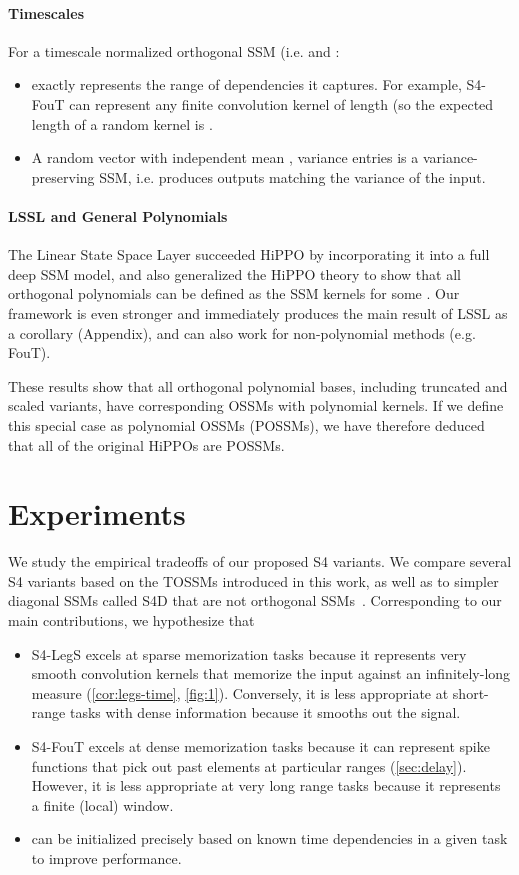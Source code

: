 \documentclass{article}
\begin{document}
\paragraph{Timescales}
For a timescale normalized orthogonal SSM (i.e.  and :
\begin{itemize}\item  exactly represents the range of dependencies it captures.
    For example, S4-FouT can represent any finite convolution kernel of length  (so the expected length of a random kernel is .
  \item A random vector  with independent mean , variance  entries is a variance-preserving SSM, i.e. produces outputs matching the variance of the input.
\end{itemize}

\paragraph{LSSL and General Polynomials}

The Linear State Space Layer \citep{gu2021lssl} succeeded HiPPO by incorporating it into a full deep SSM model, and also generalized the HiPPO theory to show that all orthogonal polynomials can be defined as the SSM kernels for some .
Our framework is even stronger and immediately produces the main result of LSSL as a corollary (Appendix), and can also work for non-polynomial methods (e.g. FouT).


These results show that all orthogonal polynomial bases, including truncated and scaled variants, have corresponding OSSMs with polynomial kernels.
If we define this special case as polynomial OSSMs (POSSMs), we have therefore deduced that all of the original HiPPOs are POSSMs.
 

\section{Experiments}
\label{sec:experiments}


We study the empirical tradeoffs of our proposed S4 variants. We compare several S4 variants based on the TOSSMs introduced in this work,
as well as to simpler diagonal SSMs called S4D that are not orthogonal SSMs~\citep{gu2022s4d}.
Corresponding to our main contributions, we hypothesize that
\begin{itemize}[leftmargin=*]\item S4-LegS excels at sparse memorization tasks because it represents very smooth convolution kernels that memorize the input against an infinitely-long measure (\cref{cor:legs-time}, \cref{fig:1}). Conversely, it is less appropriate at short-range tasks with dense information because it smooths out the signal.
  \item S4-FouT excels at dense memorization tasks because it can represent spike functions that pick out past elements at particular ranges (\cref{sec:delay}). However, it is less appropriate at very long range tasks because it represents a finite (local) window.
  \item  can be initialized precisely based on known time dependencies in a given task to improve performance.
\end{itemize}
\end{document}
